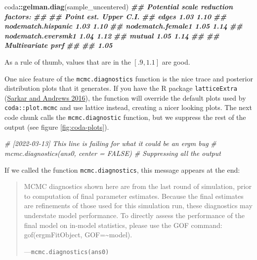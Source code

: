 \documentclass[
]{book}
\newenvironment{Shaded}{\begin{snugshade}}{\end{snugshade}}
\newcommand{\CommentTok}[1]{\textcolor[rgb]{0.56,0.35,0.01}{\textit{#1}}}
\newcommand{\DocumentationTok}[1]{\textcolor[rgb]{0.56,0.35,0.01}{\textbf{\textit{#1}}}}
\newcommand{\FunctionTok}[1]{\textcolor[rgb]{0.13,0.29,0.53}{\textbf{#1}}}
\newcommand{\NormalTok}[1]{#1}
\newcommand{\SpecialCharTok}[1]{\textcolor[rgb]{0.81,0.36,0.00}{\textbf{#1}}}
\begin{document}
\begin{enumerate}
\begin{Shaded}
\begin{Highlighting}[]
\NormalTok{coda}\SpecialCharTok{::}\FunctionTok{gelman.diag}\NormalTok{(sample\_uncentered)}
\DocumentationTok{\#\# Potential scale reduction factors:}
\DocumentationTok{\#\# }
\DocumentationTok{\#\#                    Point est. Upper C.I.}
\DocumentationTok{\#\# edges                    1.03       1.10}
\DocumentationTok{\#\# nodematch.hispanic       1.03       1.10}
\DocumentationTok{\#\# nodematch.female1        1.05       1.14}
\DocumentationTok{\#\# nodematch.eversmk1       1.04       1.12}
\DocumentationTok{\#\# mutual                   1.05       1.14}
\DocumentationTok{\#\# }
\DocumentationTok{\#\# Multivariate psrf}
\DocumentationTok{\#\# }
\DocumentationTok{\#\# 1.05}
\end{Highlighting}
\end{Shaded}

  As a rule of thumb, values that are in the \([.9,1.1]\) are good.
\end{enumerate}

One nice feature of the \texttt{mcmc.diagnostics} function is the nice trace and posterior distribution plots that it generates. If you have the R package \texttt{latticeExtra} (\protect\hyperlink{ref-R-latticeExtra}{Sarkar and Andrews 2016}), the function will override the default plots used by \texttt{coda::plot.mcmc} and use lattice instead, creating a nicer looking plots. The next code chunk calls the \texttt{mcmc.diagnostic} function, but we suppress the rest of the output (see figure \ref{fig:coda-plots}).

\begin{Shaded}
\begin{Highlighting}[]
\CommentTok{\# [2022{-}03{-}13] This line is failing for what it could be an ergm bug}
\CommentTok{\# mcmc.diagnostics(ans0, center = FALSE) \# Suppressing all the output}
\end{Highlighting}
\end{Shaded}

If we called the function \texttt{mcmc.diagnostics}, this message appears at the end:

\begin{quote}
MCMC diagnostics shown here are from the last round of simulation, prior to computation of final parameter estimates. Because the final estimates are refinements of those used for this simulation run, these diagnostics may understate model performance. To directly assess the performance of the final model on in-model statistics, please use the GOF command: gof(ergmFitObject, GOF=\textasciitilde model).

---\texttt{mcmc.diagnostics(ans0)}
\end{quote}
\end{document}
